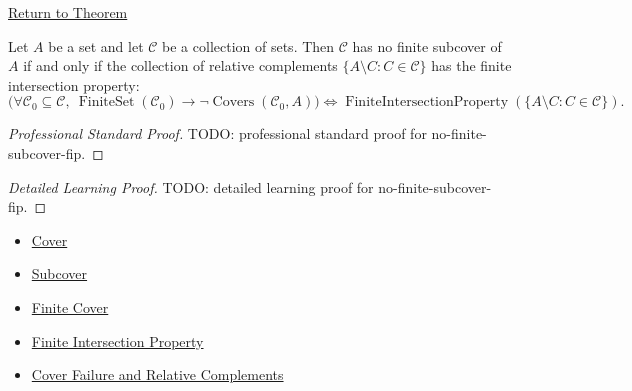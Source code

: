 \newpage
{}
\label{prf:no-finite-subcover-fip}

\begin{remark*}[Return]
\hyperref[thm:no-finite-subcover-fip]{Return to Theorem}
\end{remark*}

\begin{theorem*}
Let $A$ be a set and let $\mathcal{C}$ be a collection of sets. Then
$\mathcal{C}$ has no finite subcover of $A$ if and only if the collection of
relative complements $\{A\setminus C:C\in\mathcal{C}\}$ has the finite
intersection property:
\[
\bigl(\forall\mathcal{C}_0\subseteq\mathcal{C},\
\operatorname{FiniteSet}(\mathcal{C}_0)\to
\neg\operatorname{Covers}(\mathcal{C}_0,A)\bigr)
\iff
\operatorname{FiniteIntersectionProperty}(\{A\setminus C:C\in\mathcal{C}\}).
\]
\end{theorem*}

\begin{proof}[Professional Standard Proof]
\LRAProofBodyStart
TODO: professional standard proof for no-finite-subcover-fip.
\end{proof}

\begin{proof}[Detailed Learning Proof]
\LRAProofBodyStart
TODO: detailed learning proof for no-finite-subcover-fip.
\end{proof}

\begin{remark*}
\end{remark*}

\begin{dependencies}
\begin{itemize}
  \item \hyperref[def:cover-full]{Cover}
  \item \hyperref[def:subcover]{Subcover}
  \item \hyperref[def:finite-cover]{Finite Cover}
  \item \hyperref[def:fip]{Finite Intersection Property}
  \item \hyperref[thm:cover-failure-relative-complements]{Cover Failure and Relative Complements}
\end{itemize}
\end{dependencies}

\clearpage
